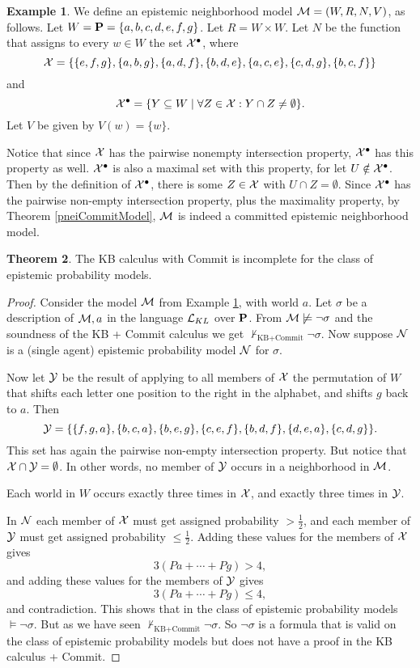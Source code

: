 \documentclass[12pt]{article}
\theoremstyle{definition}
\newtheorem{theorem}{Theorem}[section]
\newtheorem{example}[theorem]{Example}
\newcommand{\M}{{\cal M}}      %
\newcommand{\N}{{\cal N}}      %
\newcommand{\Prop}{{\bf P}}    %
\newcommand{\Lang}{{\cal L}}   %
\begin{document}
\begin{example} \label{WFmodel}
We define an epistemic neighborhood model $\M = (W,R,N,V)$, 
as follows. 
Let $W = \Prop = \{ a,b,c,d,e,f,g \}$. Let $R = W \times W$. 
Let $N$ be the function that assigns to every $w \in W$ the
set ${\cal X}^\bullet$, where 
\[
 {\cal X} = 
 \{ 
\{ e,f,g \}, 
\{ a,b,g \},
\{ a,d,f \}, 
\{ b,d,e \}, 
\{ a,c,e \},
\{ c,d,g \}, 
\{ b,c,f \} \}
\]
and 
\[
 {\cal X}^\bullet = \{ Y \subseteq W \mid \forall Z \in {\cal X}: 
 Y \cap Z \neq \emptyset \}.
\]
Let $V$ be given by $V(w) = \{ w \}$.  

Notice that since ${\cal X}$ has the pairwise nonempty intersection
property, ${\cal X}^\bullet$ has this property as well. ${\cal
X}^\bullet$ is also a maximal set with this property, for let
$U \notin {\cal X}^\bullet$. Then by the definition of ${\cal
X}^\bullet$, there is some $Z \in {\cal X}$ with $U \cap Z
= \emptyset$. Since ${\cal X}^\bullet$ has the pairwise non-empty
intersection property, plus the maximality property, by
Theorem \ref{pneiCommitModel}, $\M$ is indeed a committed epistemic
neighborhood model.
\end{example}

\begin{theorem} \label{incompleteCEPM}
The KB calculus with Commit is incomplete for the class of epistemic probability models.
\end{theorem}
\begin{proof}
Consider the model $\M$ from Example \ref{WFmodel}, with world $a$. 
Let $\sigma$ be a description of $\M,a$ in the language $\Lang_{KL}$
over $\Prop$. From $\M \not\models \neg \sigma$ and the soundness of
the KB + Commit calculus we get $\not\vdash_{\text{KB+Commit}} \neg \sigma$.  Now
suppose $\N$ is a (single agent) epistemic probability model $\N$ for
$\sigma$.

Now let ${\cal Y}$ be the result of applying to all members of ${\cal
  X}$ the permutation of $W$ that shifts each letter one position to
the right in the alphabet, and shifts $g$ back to $a$. Then 
\[
 {\cal Y} = 
 \{ \{f,g,a \}, 
    \{b,c,a \}, 
    \{ b,e,g \}, 
    \{ c,e,f \}, 
    \{ b,d,f \}, 
    \{ d,e,a \}, 
    \{ c,d,g \} \}. 
\]
This set has again the pairwise non-empty intersection property.
But notice that ${\cal X} \cap {\cal Y} = \emptyset$. 
In other words, no member of ${\cal Y}$ occurs in a neighborhood
in $\M$. 

Each world in $W$ occurs exactly three times in ${\cal X}$, and exactly 
three times in ${\cal Y}$. 

In $\N$ each member of ${\cal X}$ must get assigned probability
$> \frac 12$, and each member of ${\cal Y}$ must get assigned
probability $\leq \frac 12$.  Adding these values for the members of
${\cal X}$ gives
\[
  3(Pa + \cdots + Pg) > 4,
\]
and adding these values for the members of  ${\cal Y}$ gives
\[
 3(Pa + \cdots + Pg) \leq 4, 
\]
and contradiction. This shows that in the class of 
epistemic probability models $\models \neg \sigma$. 
But as we have seen $\not\vdash_{\text{KB+Commit}} \neg \sigma$. 
So $\neg \sigma$ is a formula that is valid on the class
of epistemic probability models but does not have a proof
in the KB calculus + Commit. 
\end{proof} 
\end{document}

